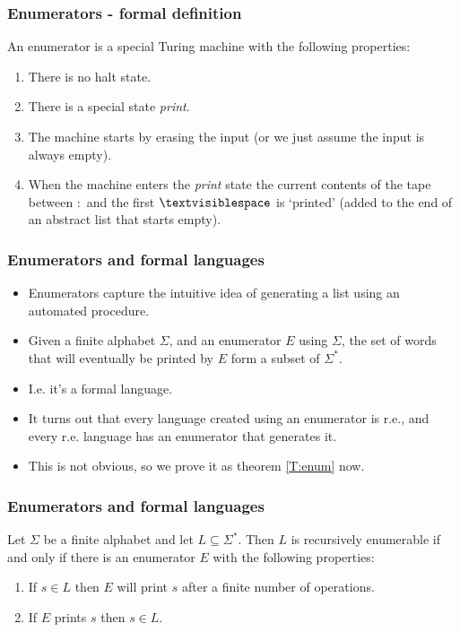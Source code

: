 \documentclass[handout]{beamer}
\newcommand{\tvs}{\textvisiblespace}
\begin{document}
\begin{frame}
\frametitle{Enumerators - formal definition}
\begin{definition}[Enumerator]
An enumerator is a special Turing machine with the following properties:
\begin{enumerate}
\item There is no halt state.
\item There is a special state \emph{print}.
\item The machine starts by erasing the input (or we just assume the input is always empty).
\item When the machine enters the \emph{print} state the current contents of the tape between $:$ and the first $\tvs$ is `printed' (added to the end of an abstract list that starts empty).
\end{enumerate}
\end{definition} 
\end{frame}

\begin{frame}
\frametitle{Enumerators and formal languages}
\begin{itemize}
\item Enumerators capture the intuitive idea of generating a list using an automated procedure. 
\vspace{0.2cm}
\item Given a finite alphabet $\Sigma$, and an enumerator $E$ using $\Sigma$, the set of words that will eventually be printed by $E$ form a subset of $\Sigma^*$.
\vspace{0.2cm}
\item I.e. it's a formal language. 
\vspace{0.2cm}
\item It turns out that every language created using an enumerator is r.e., and every r.e. language has an enumerator that generates it. 
\vspace{0.2cm}
\item This is not obvious, so we prove it as theorem \ref{T:enum} now.
\end{itemize}
\end{frame}

\begin{frame}
\frametitle{Enumerators and formal languages}
\begin{theorem}\label{T:enum}
Let $\Sigma$ be a finite alphabet and let $L\subseteq\Sigma^*$. Then $L$ is recursively enumerable if and only if there is an enumerator $E$ with the following properties:
\vspace{0.2cm}
\begin{enumerate}
\item If $s\in L$ then $E$ will print $s$ after a finite number of operations.
\vspace{0.2cm}
\item If $E$ prints $s$ then $s\in L$.
\end{enumerate}
\end{theorem}

\end{frame}
\end{document}
